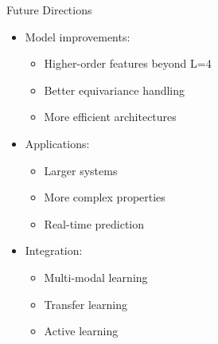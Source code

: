 \begin{frame}{Future Directions}
    \begin{itemize}
        \item Model improvements:
        \begin{itemize}
            \item Higher-order features beyond L=4
            \item Better equivariance handling
            \item More efficient architectures
        \end{itemize}
        \item Applications:
        \begin{itemize}
            \item Larger systems
            \item More complex properties
            \item Real-time prediction
        \end{itemize}
        \item Integration:
        \begin{itemize}
            \item Multi-modal learning
            \item Transfer learning
            \item Active learning
        \end{itemize}
    \end{itemize}
\end{frame} 